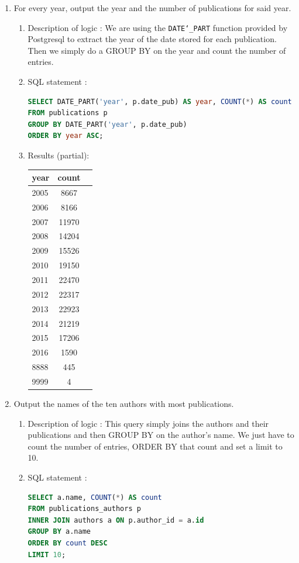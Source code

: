 \documentclass[doubleside, titlepage]{article}
\begin{document}
\begin{enumerate}
\item For every year, output the year and the number of publications for said year.
	\begin{enumerate}
	\item Description of logic : We are using the \texttt{DATE\char`_PART} function provided by Postgresql to extract the year of the date stored for each publication. Then
      we simply do a GROUP BY on the year and count the number of entries.
	\item SQL statement :
		\begin{lstlisting}[language=SQL,showspaces=false,basicstyle=\ttfamily,numberstyle=\tiny,commentstyle=\color{gray}]
SELECT DATE_PART('year', p.date_pub) AS year, COUNT(*) AS count
FROM publications p
GROUP BY DATE_PART('year', p.date_pub)
ORDER BY year ASC;
		\end{lstlisting}

	\item Results (partial):\\

	\begin{tabular}{|l|c|r|}
  \hline
  year & count \\
  \hline
2005 & 	8667\\
2006 & 	8166\\
2007 & 	11970\\
2008 & 	14204\\
2009 & 	15526\\
2010 & 	19150\\
2011 & 	22470\\
2012 & 	22317\\
2013 & 	22923\\
2014 & 	21219\\
2015 & 	17206\\
2016 & 	1590\\
8888 & 	445\\
9999 & 	4\\
\hline
\end{tabular}

	\end{enumerate}
\item Output the names of the ten authors with most publications.

		\begin{enumerate}
	\item Description of logic : This query simply joins the authors and their publications and then GROUP BY on the author’s name. We just have to count the number of entries, ORDER BY that count and set a limit to 10.
	\item SQL statement :
		\begin{lstlisting}[language=SQL,showspaces=false,basicstyle=\ttfamily,numberstyle=\tiny,commentstyle=\color{gray}]
SELECT a.name, COUNT(*) AS count
FROM publications_authors p
INNER JOIN authors a ON p.author_id = a.id
GROUP BY a.name
ORDER BY count DESC
LIMIT 10;
		\end{lstlisting}


\end{enumerate}
\end{enumerate}
\end{document}
